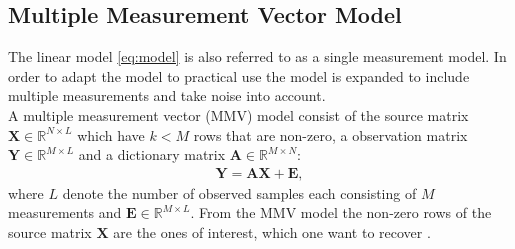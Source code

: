 \subsection{Multiple Measurement Vector Model}
The linear model \eqref{eq:model} is also referred to as a single measurement model. In order to adapt the model to practical use the model is expanded to include multiple measurements and take noise into account.\\ 
A multiple measurement vector (MMV) model consist of the source matrix $\mathbf{X} \in \mathbb{R}^{N \times L}$ which have $k < M$ rows that are non-zero, a observation matrix $\mathbf{Y} \in \mathbb{R}^{M \times L}$ and a dictionary matrix $\mathbf{A} \in \mathbb{R}^{M \times N}$:
\begin{align*}
\mathbf{Y} = \mathbf{AX}+\textbf{E},
\end{align*}
where $L$ denote the number of observed samples each consisting of $M$ measurements and $\textbf{E} \in \mathbb{R}^{M \times L}$. From the MMV model the non-zero rows of the source matrix $\mathbf{X}$ are the ones of interest, which one want to recover \cite[p. 11]{PHD}.
